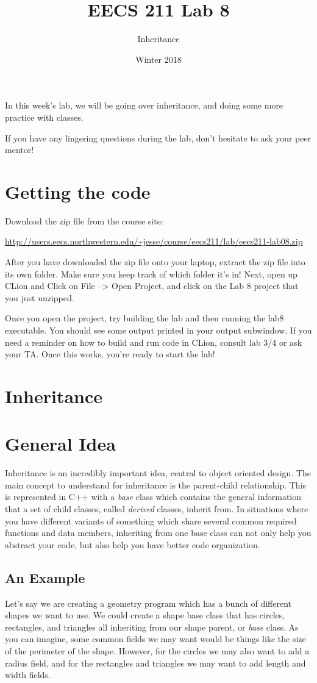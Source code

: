 \documentclass{tufte-handout}
\title{EECS 211 Lab 8}
\author{Inheritance}
\date{Winter 2018}
\begin{document}
\maketitle

In this week's lab, we will be going over inheritance, and doing some more practice with classes.


If you have any lingering questions during the lab, don't hesitate to ask your peer mentor!
\section{Getting the code}
Download the zip file from the course site: \medskip

\url{http://users.eecs.northwestern.edu/~jesse/course/eecs211/lab/eecs211-lab08.zip}

\medskip \noindent
After you have downloaded the zip file onto your laptop, extract the zip file into its own folder. Make sure you keep track of which folder it's in!  Next, open up CLion and Click on File --> Open Project, and click on the Lab 8 project that you just unzipped. 

Once you open the project, try building the lab and then running the lab8 executable. 
You should see some output printed in your output subwindow.
If you need a reminder on how to build and run code in CLion, consult lab 3/4 or ask your TA.
Once this works, you're ready to start the lab!

\section{Inheritance}

\section {General Idea}
Inheritance is an incredibly important idea, central to object oriented design.
The main concept to understand for inheritance is the parent-child relationship.
This is represented in C++ with a \textit{base} class which contains the general information that a set of child classes, called \textit{derived} classes, inherit from.
In situations where you have different variants of something which share several common required functions and data members, inheriting from one base class can not only help you abstract your code, but also help you have better code organization.

\subsection{An Example}
Let's say we are creating a geometry program which has a bunch of different shapes we want to use.
We could create a shape base class that has circles, rectangles, and triangles all inheriting from our shape parent, or \textit{base} class.
As you can imagine, some common fields we may want would be things like the size of the perimeter of the shape.
However, for the circles we may also want to add a radius field, and for the rectangles and triangles we may want to add length and width fields.
\end{document}
